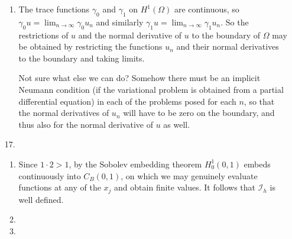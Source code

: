 \documentclass[11pt,leqno]{article}
\theoremstyle{plain}
\theoremstyle{definition}
\numberwithin{equation}{section}
\numberwithin{lem}{section}
\begin{document}
\begin{enumerate}
\begin{enumerate}
        \item The trace functions $\gamma_0$ and $\gamma_1$ on $H^1(\Omega)$ are continuous, so $\gamma_0 u = \lim_{n\to\infty}\gamma_0 u_n$ and similarly $\gamma_1 u = \lim_{n\to\infty}\gamma_1 u_n$. So the restrictions of $u$ and the normal derivative of $u$ to the boundary of $\Omega$ may be obtained by restricting the functions $u_n$ and their normal derivatives to the boundary and taking limits.
        
        Not sure what else we can do? Somehow there must be an implicit Neumann condition (if the variational problem is obtained from a partial differential equation) in each of the problems posed for each $n$, so that the normal derivatives of $u_n$ will have to be zero on the boundary, and thus also for the normal derivative of $u$ as well.
    \end{enumerate}
    \item[17.] \begin{enumerate}
        \item Since $1\cdot 2>1$, by the Sobolev embedding theorem $H^1_0(0,1)$ embeds continuously into $C_B(0,1)$, on which we may genuinely evaluate functions at any of the $x_j$ and obtain finite values. It follows that $\mathcal I_h$ is well defined. 
        \item 
        \item 
    \end{enumerate}
\end{enumerate}
\end{document}
